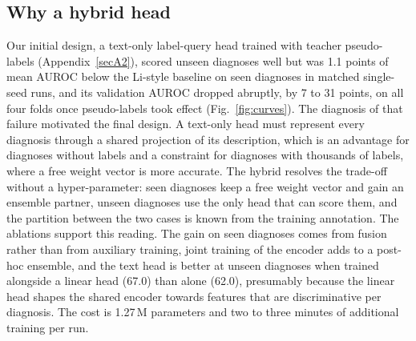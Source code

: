 \subsection{Why a hybrid head}\label{sec:disc_hybrid}
Our initial design, a text-only label-query head trained with teacher pseudo-labels (Appendix~\ref{secA2}), scored unseen diagnoses well but was 1.1 points of mean AUROC below the Li-style baseline on seen diagnoses in matched single-seed runs, and its validation AUROC dropped abruptly, by 7 to 31 points, on all four folds once pseudo-labels took effect (Fig.~\ref{fig:curves}). The diagnosis of that failure motivated the final design. A text-only head must represent every diagnosis through a shared projection of its description, which is an advantage for diagnoses without labels and a constraint for diagnoses with thousands of labels, where a free weight vector is more accurate. The hybrid resolves the trade-off without a hyper-parameter: seen diagnoses keep a free weight vector and gain an ensemble partner, unseen diagnoses use the only head that can score them, and the partition between the two cases is known from the training annotation. The ablations support this reading. The gain on seen diagnoses comes from fusion rather than from auxiliary training, joint training of the encoder adds to a post-hoc ensemble, and the text head is better at unseen diagnoses when trained alongside a linear head (67.0) than alone (62.0), presumably because the linear head shapes the shared encoder towards features that are discriminative per diagnosis. The cost is 1.27\,M parameters and two to three minutes of additional training per run.

